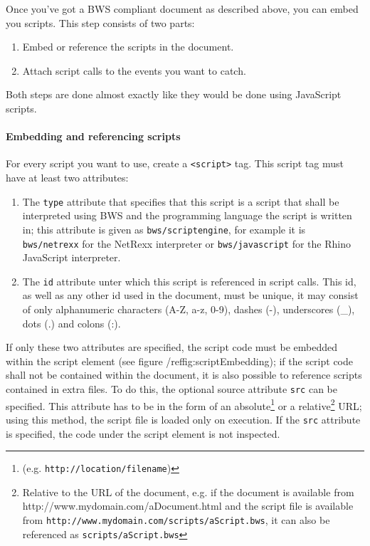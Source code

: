 Once you've got a BWS compliant document as described above, you can embed you scripts. This step consists of two parts: 

\begin{enumerate}

\item Embed or reference the scripts in the document.

\item Attach script calls to the events you want to catch.

\end{enumerate}

Both steps are done almost exactly like they would be done using JavaScript scripts.

\paragraph{Embedding and referencing scripts}

For every script you want to use, create a \texttt{<script>} tag. This script tag must have at least two attributes:

\begin{enumerate}

\item The \texttt{type} attribute that specifies that this script is a script that shall be interpreted using BWS and the programming language the script is written in; this attribute is given as \texttt{bws/scriptengine}, for example it is \texttt{bws/netrexx} for the NetRexx interpreter or \texttt{bws/javascript} for the Rhino JavaScript interpreter.

\item The \texttt{id} attribute unter which this script is referenced in script calls. This id, as well as any other id used in the document, must be unique, it may consist of only alphanumeric characters (A-Z, a-z, 0-9), dashes (-), underscores (\_), dots (.) and colons (:).

\end{enumerate}

If only these two attributes are specified, the script code must be embedded within the script element (see figure /ref{fig:scriptEmbedding}); if the script code shall not be contained within the document, it is also possible to reference scripts contained in extra files. To do this, the optional source attribute \texttt{src} can be specified. This attribute has to be in the form of an absolute\footnote{(e.g. \texttt{http://location/filename})} or a relative\footnote{Relative to the URL of the document, e.g. if the document is available from http://www.mydomain.com/aDocument.html and the script file is available from \texttt{http://www.mydomain.com/scripts/aScript.bws}, it can also be referenced as \texttt{scripts/aScript.bws}} URL; using this method, the script file is loaded only on execution. If the \texttt{src} attribute is specified, the code under the script element is not inspected.

